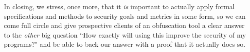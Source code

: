\documentclass[compsoc,conference,a4paper,10pt,times]{IEEEtran}
\begin{document}
In closing, we stress, once more, that it \emph{is} important to actually apply formal specifications and methods to security goals and metrics in some form, so we can come full circle and give prospective clients of an obfuscation tool a clear answer to the \emph{other} big question ``How exactly will using this improve the security of my programs?" and be able to back our answer with a proof that it actually does so.

%



\end{document}
